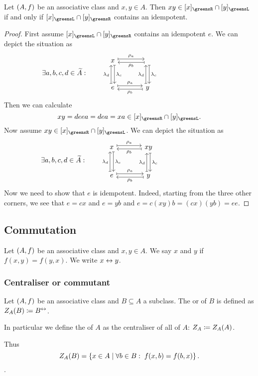\begin{proposition}
Let $\left( A, f \right)$ be an associative class and $x,y\in A$. Then $xy\in [x]_\greensR \cap [y]_\greensL$ \textup{if and only if} $[x]_\greensL \cap [y]_\greensR$ contains an idempotent.
\end{proposition}
\begin{proof}
First assume $[x]_\greensL \cap [y]_\greensR$ contains an idempotent $e$. We can depict the situation as
\[ \hspace{-8.4em} \exists a,b,c,d \in \widetilde{A}: \qquad \begin{tikzcd}[sep=large]
x \ar[r, maps to, shift left, "\rho_a"] \ar[d, maps to, shift left, "\lambda_c"] &  \ar[l, maps to, shift left, "\rho_b"] \ar[d, maps to, shift left, "\lambda_c"] \\
e \ar[u, maps to, shift left, "\lambda_d"] \ar[r, maps to, shift left, "\rho_a"] & y \ar[u, maps to, shift left, "\lambda_d"] \ar[l, maps to, shift left, "\rho_b"]
\end{tikzcd} \]
Then we can calculate
\[ xy = deea = dea = xa \in [x]_\greensR \cap [y]_\greensL. \]
Now assume $xy\in [x]_\greensR \cap [y]_\greensL$.
We can depict the situation as
\[ \hspace{-8.4em} \exists a,b,c,d \in \widetilde{A}: \qquad \begin{tikzcd}[sep=large]
x \ar[r, maps to, shift left, "\rho_a"] \ar[d, maps to, shift left, "\lambda_c"] & xy \ar[l, maps to, shift left, "\rho_b"] \ar[d, maps to, shift left, "\lambda_c"] \\
e \ar[u, maps to, shift left, "\lambda_d"] \ar[r, maps to, shift left, "\rho_a"] & y \ar[u, maps to, shift left, "\lambda_d"] \ar[l, maps to, shift left, "\rho_b"]
\end{tikzcd} \]
Now we need to show that $e$ is idempotent. Indeed, starting from the three other corners, we see that $e = cx$ and $e = yb$ and $e = c(xy)b = (cx)(yb) = ee$.
\end{proof}

\subsection{Commutation}
\begin{definition}
Let $\left( A,f \right)$ be an associative class and $x,y \in A$. We say $x$ and $y$  if $f(x,y) = f(y,x)$. We write $x\leftrightarrow y$.
\end{definition}


\subsubsection{Centraliser or commutant}
\begin{definition}
Let $\left( A,f \right)$ be an associative class and $B\subseteq A$ a subclass. The  or  of $B$ is defined as $Z_A(B) \coloneqq B^\leftrightarrow$.

In particular we define the  of $A$ as the centraliser of all of $A$: $Z_A \coloneqq Z_A(A)$.
\end{definition}
Thus
\[ Z_A(B) = \left\{ x\in A \;\middle|\; \forall b\in B:\;f(x,b) = f(b,x) \right\}. \].

